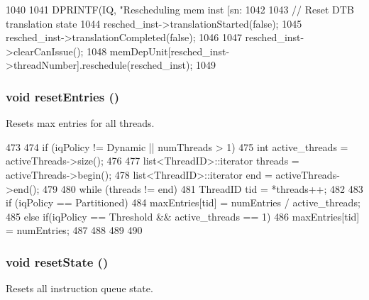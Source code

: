 \begin{DoxyCode}
1040 {
1041     DPRINTF(IQ, "Rescheduling mem inst [sn:%
1042 
1043     // Reset DTB translation state
1044     resched_inst->translationStarted(false);
1045     resched_inst->translationCompleted(false);
1046 
1047     resched_inst->clearCanIssue();
1048     memDepUnit[resched_inst->threadNumber].reschedule(resched_inst);
1049 }
\end{DoxyCode}
\hypertarget{classInstructionQueue_aaf9a05771a835f9f8d634cef36e24d40}{
\subsubsection[{resetEntries}]{\setlength{\rightskip}{0pt plus 5cm}void resetEntries ()}}
\label{classInstructionQueue_aaf9a05771a835f9f8d634cef36e24d40}
Resets max entries for all threads. 


\begin{DoxyCode}
473 {
474     if (iqPolicy != Dynamic || numThreads > 1) {
475         int active_threads = activeThreads->size();
476 
477         list<ThreadID>::iterator threads = activeThreads->begin();
478         list<ThreadID>::iterator end = activeThreads->end();
479 
480         while (threads != end) {
481             ThreadID tid = *threads++;
482 
483             if (iqPolicy == Partitioned) {
484                 maxEntries[tid] = numEntries / active_threads;
485             } else if(iqPolicy == Threshold && active_threads == 1) {
486                 maxEntries[tid] = numEntries;
487             }
488         }
489     }
490 }
\end{DoxyCode}
\hypertarget{classInstructionQueue_a755ee993c2d4e9d422c37990b15afa37}{
\subsubsection[{resetState}]{\setlength{\rightskip}{0pt plus 5cm}void resetState ()}}
\label{classInstructionQueue_a755ee993c2d4e9d422c37990b15afa37}
Resets all instruction queue state. 


